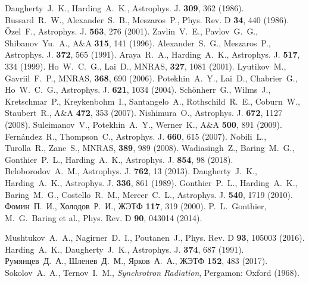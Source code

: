 \documentclass[cp1251%
               ]{jetp} %
\begin{document}
\begin{references}
%
  Daugherty~J.~K., Harding~A.~K., Astrophys. J. {\bf 309}, 362 (1986).
%
Bussard~R.~W., Alexander~S.~B., Meszaros~P., Phys. Rev. D {\bf 34}, 440 (1986).
%
  {\"O}zel~F., Astrophys. J. {\bf 563}, 276 (2001).
%
  Zavlin~V.~E., Pavlov~G.~G., Shibanov~Yu.~A., A\&A {\bf 315}, 141 (1996).
%
   Alexander~S.~G., Meszaros~P.,  Astrophys. J. {\bf 372}, 565 (1991).
%
  Araya~R.~A., Harding~A.~K.,  Astrophys. J. {\bf 517}, 334 (1999).
%
  Ho~W.~C.~G., Lai~D., MNRAS, {\bf 327}, 1081 (2001).
%
   Lyutikov~M., Gavriil~F.~P., MNRAS, {\bf 368}, 690 (2006).
%
  Potekhin~A.~Y., Lai~D., Chabrier~G., Ho~W.~C.~G., Astrophys. J. {\bf 621}, 1034 (2004).
%
   Sch{\"o}nherr~G., Wilms~J., Kretschmar~P., Kreykenbohm~I., Santangelo~A., Rothschild~R.~E., Coburn~W., Staubert~R., 
   A{\&}A {\bf 472}, 353 (2007).
%
  Nishimura~O., Astrophys. J. {\bf 672}, 1127 (2008).
   Suleimanov~V., Potekhin~A.~Y., Werner~K., A{\&}A {\bf 500}, 891 (2009).
   Fern{\'a}ndez~R., Thompson~C., Astrophys. J. {\bf 660}, 615 (2007).
Nobili~L., Turolla~R., Zane~S., MNRAS, {\bf 389}, 989 (2008).
%
Wadiasingh~Z., Baring~M.~G., Gonthier~P.~L., Harding~A.~K., Astrophys. J. {\bf 854}, 98 (2018).
%
  Beloborodov~A.~M., Astrophys. J. {\bf 762}, 13 (2013).
%
  Daugherty~J.~K., Harding~A.~K., Astrophys. J. {\bf 336}, 861 (1989).
%
Gonthier~P.~L., Harding~A.~K., Baring~M.~G., Costello~R.~M., Mercer~C.~L., Astrophys. J. {\bf 540}, 1719 (2010).
%
Фомин~П.~И., Холодов~Р.~И., ЖЭТФ {\bf 117}, 319 (2000). 
%
P.~L.~Gonthier, M.~G.~Baring et al., 
   Phys. Rev. D {\bf 90},  043014 (2014).

%
Mushtukov~A.~A., Nagirner~D.~I., Poutanen~J., Phys. Rev. D {\bf 93}, 105003 (2016).
%
Harding~A.~K., Daugherty~J.~K., Astrophys. J. {\bf 374}, 687 (1991).
%
Румянцев~Д.~А., Шленев~Д.~М., Ярков~А.~А., ЖЭТФ {\bf 152}, 483 (2017). 
%
   Sokolov~A.~A., Ternov~I.~M., {\it Synchrotron Radiation}, Pergamon: Oxford (1968).


\end{references}
\end{document}
